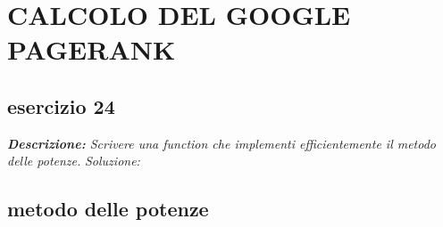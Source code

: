 \chapter{CALCOLO DEL GOOGLE PAGERANK}
\section{esercizio 24}
\textit{\textbf{Descrizione:}  Scrivere una function che implementi efficientemente il metodo delle potenze.}\newline
\noindent\emph{Soluzione: }\newline
\section*{metodo delle potenze}
\newpage